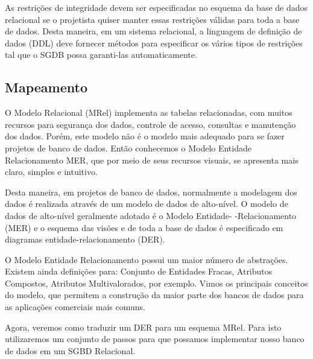 \documentclass{article}
\begin{document}
As restrições de integridade devem ser especificadas no esquema da base de dados relacional se o projetista quiser manter essas restrições válidas para toda a base de dados. Desta maneira, em um sistema relacional, a linguagem de definição de dados (DDL) deve fornecer métodos para especificar os vários tipos de restrições tal que o SGDB possa garanti-las automaticamente.

\subsection{Mapeamento}
O Modelo Relacional (MRel) implementa as tabelas relacionadas, com muitos recursos para segurança dos dados, controle de acesso, consultas e manutenção dos dados. Porém, este modelo não é o modelo mais adequado para se fazer projetos de banco de dados. Então conhecemos o Modelo Entidade Relacionamento MER, que por meio de seus recursos visuais, se apresenta mais claro, simples e intuitivo.

Desta maneira, em projetos de banco de dados, normalmente a modelagem dos dados é realizada através de um modelo de dados de alto-nível. O modelo de dados de alto-nível geralmente adotado é o Modelo Entidade- -Relacionamento (MER) e o esquema das visões e de toda a base de dados é especificado em diagramas entidade-relacionamento (DER).

O Modelo Entidade Relacionamento possui um maior número de abstrações. Existem ainda definições para: Conjunto de Entidades Fracas, Atributos Compostos, Atributos Multivalorados, por exemplo. Vimos os principais conceitos do modelo, que permitem a construção da maior parte dos bancos de dados para as aplicações comerciais mais comuns.

Agora, veremos como traduzir um DER para um esquema MRel. Para isto utilizaremos um conjunto de passos para que possamos implementar nosso banco de dados em um SGBD Relacional.
\end{document}
